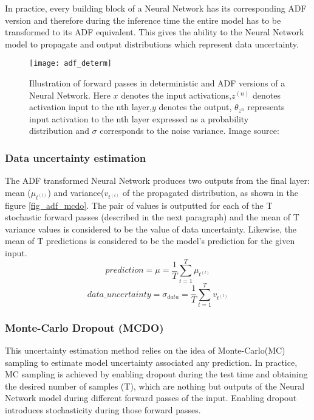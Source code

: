 	In practice, every building block of a Neural Network has its corresponding ADF version and therefore during the inference time the entire model has to be transformed to its ADF equivalent. This gives the ability to the Neural Network model to propagate and output distributions which represent data uncertainty.
	\begin{figure}[h]
		\centering
		\texttt{[image: adf\_determ]}
		\caption{Illustration of forward passes in deterministic and ADF versions of a Neural Network. Here $x$ denotes the input activations,$z^(n)$ denotes activation input to the nth layer,$y$ denotes the output, $\theta_{z^n}$ represents input activation to the nth layer expressed as a probability distribution and $\sigma$ corresponds to the noise variance. Image source: }
	\end{figure}
	
	\subsubsection{Data uncertainty estimation}
	The ADF transformed Neural Network produces two outputs from the final layer: mean ($\mu_{t^{(l)}}$) and variance($v_{t^{(l)}}$ of the propagated distribution, as shown in the figure \ref{fig_adf_mcdo}. The pair of values is outputted for each of the T stochastic forward passes (described in the next paragraph) and the mean of T variance values is considered to be the value of data uncertainty. Likewise, the mean of T predictions is considered to be the model's prediction for the given input.
	\begin{equation}
		prediction = \mu = \frac{1}{T}\sum_{t=1}^{T}\mu_{t^{(l)}}
	\end{equation}	 
	\begin{equation}
		data\_uncertainty = \sigma_{data}=\frac{1}{T}\sum_{t=1}^{T}v_{t^{(l)}}
	\end{equation}
	
	\subsubsection{Monte-Carlo Dropout (MCDO)}
	
	This uncertainty estimation method relies on the idea of Monte-Carlo(MC) sampling to estimate model uncertainty associated any prediction. In practice, MC sampling is achieved by enabling dropout during the test time and obtaining the desired number of samples (T), which are nothing but outputs of the Neural Network model during different forward passes of the input. Enabling dropout introduces stochasticity during those forward passes.
	
